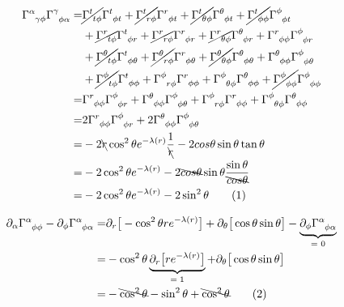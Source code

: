 \documentclass[]{article}
\newcommand\numberthis{\addtocounter{equation}{1}\tag{\theequation}}
\begin{document}
\begin{align*}
	\Gamma\indices{^\alpha_{\gamma\phi}} \Gamma\indices{^\gamma_{\phi\alpha}}=& \cancel{\Gamma\indices{^t_{t\phi}}} \Gamma\indices{^t_{\phi t}}+\cancel{\Gamma\indices{^t_{r\phi}}} \Gamma\indices{^r_{\phi t}}+\cancel{\Gamma\indices{^t_{\theta\phi}}} \Gamma\indices{^\theta_{\phi t}}+\cancel{\Gamma\indices{^t_{\phi\phi}}} \Gamma\indices{^\phi_{\phi t}}\\
	&+ \cancel{\Gamma\indices{^r_{t\phi}}} \Gamma\indices{^t_{\phi r}} + \cancel{\Gamma\indices{^r_{r\phi}}} \Gamma\indices{^r_{\phi r}}+ \cancel{\Gamma\indices{^r_{\theta\phi}}} \Gamma\indices{^\theta_{\phi r}}+ \Gamma\indices{^r_{\phi\phi}} \Gamma\indices{^\phi_{\phi r}}\\
	&+ \cancel{\Gamma\indices{^\theta_{t\phi}}} \Gamma\indices{^t_{\phi\theta}}+ \cancel{\Gamma\indices{^\theta_{r\phi}}} \Gamma\indices{^r_{\phi\theta}}+ \cancel{\Gamma\indices{^\theta_{\theta\phi}}} \Gamma\indices{^\theta_{\phi\theta}}+ \Gamma\indices{^\theta_{\phi\phi}} \Gamma\indices{^\phi_{\phi\theta}} \\
	&+ \cancel{\Gamma\indices{^\phi_{t\phi}}} \Gamma\indices{^t_{\phi\phi}}+ \Gamma\indices{^\phi_{r\phi}} \Gamma\indices{^r_{\phi\phi}}+ \Gamma\indices{^\phi_{\theta\phi}} \Gamma\indices{^\theta_{\phi\phi}}+ \cancel{\Gamma\indices{^\phi_{\phi\phi}}} \Gamma\indices{^\phi_{\phi\phi}}\\
	=& \Gamma\indices{^r_{\phi\phi}} \Gamma\indices{^\phi_{\phi r}}+  \Gamma\indices{^\theta_{\phi\phi}} \Gamma\indices{^\phi_{\phi\theta}} + \Gamma\indices{^\phi_{r\phi}} \Gamma\indices{^r_{\phi\phi}}+ \Gamma\indices{^\phi_{\theta\phi}} \Gamma\indices{^\theta_{\phi\phi}}\\
	=& 2 \Gamma\indices{^r_{\phi\phi}} \Gamma\indices{^\phi_{\phi r}}+  2 \Gamma\indices{^\theta_{\phi\phi}} \Gamma\indices{^\phi_{\phi\theta}}\\
	=& -2\bcancel{ r} \cos^2 \theta e^{- \lambda(r)} \frac{1}{\bcancel{r}}  - 2 cos\theta \sin\theta \tan\theta\\
	=& -2 \cos^2 \theta e^{- \lambda(r)}   - 2 \bcancel{cos\theta} \sin\theta \frac{\sin\theta}{\bcancel{cos\theta}} \\
	=& -2 \cos^2 \theta e^{- \lambda(r)}   - 2  \sin^2\theta  \numberthis \label{eq:prod:2}
\end{align*}

\begin{align*}
	\partial_\alpha \Gamma\indices{^\alpha_{\phi\phi}} - \partial_\phi \Gamma\indices{^\alpha_{\phi\alpha}} =& \partial_r \big[- \cos^2 \theta r e^{-\lambda(r)}\big]+ \partial_\theta \big[\cos\theta \sin\theta\big]-\underbrace{\partial_\phi \Gamma\indices{^\alpha_{\phi\alpha}}}_\text{= 0}\\
	=& - \cos^2 \theta \underbrace{\partial_r \big[ r e^{-\lambda(r)}\big]}_\text{$=1$}+ \partial_\theta \big[\cos\theta \sin\theta\big]\\
	=& - \bcancel{\cos^2 \theta} -\sin^2\theta +\bcancel{\cos^2 \theta} \numberthis \label{eq:phi:phi:deriv}
\end{align*}
\end{document}
